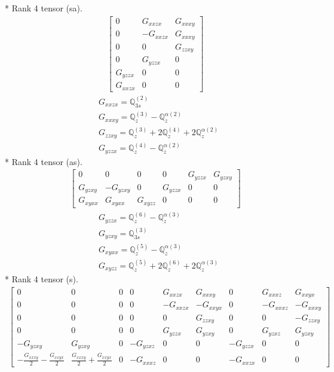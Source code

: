 \documentclass[fleqn,8pt,landscape]{jsarticle}
\begin{document}
* Rank 4 tensor (sa).
\begin{align*}
\begin{bmatrix} 0 & G_{xxzx} & G_{xxxy} \\ 0 & - G_{xxzx} & G_{xxxy} \\ 0 & 0 & G_{zzxy} \\ 0 & G_{yzzx} & 0 \\ G_{yzzx} & 0 & 0 \\ G_{xxzx} & 0 & 0 \end{bmatrix}
\end{align*}
\begin{align*}
& G_{xxzx} = \mathbb{Q}_{3s}^{(2)} \\
& G_{xxxy} = \mathbb{Q}_{z}^{(3)} - \mathbb{Q}_{z}^{\alpha(2)} \\
& G_{zzxy} = \mathbb{Q}_{z}^{(3)} + 2 \mathbb{Q}_{z}^{(4)} + 2 \mathbb{Q}_{z}^{\alpha(2)} \\
& G_{yzzx} = \mathbb{Q}_{z}^{(4)} - \mathbb{Q}_{z}^{\alpha(2)}
\end{align*}
* Rank 4 tensor (as).
\begin{align*}
\begin{bmatrix} 0 & 0 & 0 & 0 & G_{yzzx} & G_{yzxy} \\ G_{yzxy} & - G_{yzxy} & 0 & G_{yzzx} & 0 & 0 \\ G_{xyxx} & G_{xyxx} & G_{xyzz} & 0 & 0 & 0 \end{bmatrix}
\end{align*}
\begin{align*}
& G_{yzzx} = \mathbb{Q}_{z}^{(6)} - \mathbb{Q}_{z}^{\alpha(3)} \\
& G_{yzxy} = \mathbb{Q}_{3s}^{(3)} \\
& G_{xyxx} = \mathbb{Q}_{z}^{(5)} - \mathbb{Q}_{z}^{\alpha(3)} \\
& G_{xyzz} = \mathbb{Q}_{z}^{(5)} + 2 \mathbb{Q}_{z}^{(6)} + 2 \mathbb{Q}_{z}^{\alpha(3)}
\end{align*}
* Rank 4 tensor (s).
\begin{align*}
\begin{bmatrix} 0 & 0 & 0 & 0 & G_{xxzx} & G_{xxxy} & 0 & G_{xxxz} & G_{xxyx} \\ 0 & 0 & 0 & 0 & - G_{xxzx} & - G_{xxyx} & 0 & - G_{xxxz} & - G_{xxxy} \\ 0 & 0 & 0 & 0 & 0 & G_{zzxy} & 0 & 0 & - G_{zzxy} \\ 0 & 0 & 0 & 0 & G_{yzzx} & G_{yzxy} & 0 & G_{yzxz} & G_{yzxy} \\ - G_{yzxy} & G_{yzxy} & 0 & - G_{yzxz} & 0 & 0 & - G_{yzzx} & 0 & 0 \\ - \frac{G_{xxxy}}{2} - \frac{G_{xxyx}}{2} & \frac{G_{xxxy}}{2} + \frac{G_{xxyx}}{2} & 0 & - G_{xxxz} & 0 & 0 & - G_{xxzx} & 0 & 0 \end{bmatrix}
\end{align*}
\end{document}
